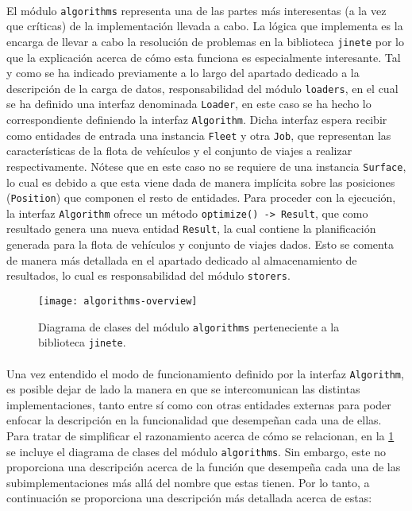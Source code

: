 \documentclass{subfiles}
\begin{document}
          \paragraph{}
          El módulo \texttt{algorithms} representa una de las partes más interesentas (a la vez que críticas) de la implementación llevada a cabo. La lógica que implementa es la encarga de llevar a cabo la resolución de problemas en la biblioteca \texttt{jinete} por lo que la explicación acerca de cómo esta funciona es especialmente interesante. Tal y como se ha indicado previamente a lo largo del apartado dedicado a la descripción de la carga de datos, responsabilidad del módulo \texttt{loaders}, en el cual se ha definido una interfaz denominada \texttt{Loader}, en este caso se ha hecho lo correspondiente definiendo la interfaz \texttt{Algorithm}. Dicha interfaz espera recibir como entidades de entrada una instancia \texttt{Fleet} y otra \texttt{Job}, que representan las características de la flota de vehículos y el conjunto de viajes a realizar respectivamente. Nótese que en este caso no se requiere de una instancia \texttt{Surface}, lo cual es debido a que esta viene dada de manera implícita sobre las posiciones (\texttt{Position}) que componen el resto de entidades. Para proceder con la ejecución, la interfaz \texttt{Algorithm} ofrece un método \verb|optimize() -> Result|, que como resultado genera una nueva entidad \texttt{Result}, la cual contiene la planificación generada para la flota de vehículos y conjunto de viajes dados. Esto se comenta de manera más detallada en el apartado dedicado al almacenamiento de resultados, lo cual es responsabilidad del módulo \texttt{storers}.

          \begin{figure}[!ht]
            \centering
            \texttt{[image: algorithms-overview]}
            \caption{Diagrama de clases del módulo \texttt{algorithms} perteneciente a la biblioteca \texttt{jinete}.}
            \label{img:algorithms_overview}
          \end{figure}

          \paragraph{}
          Una vez entendido el modo de funcionamiento definido por la interfaz \texttt{Algorithm}, es posible dejar de lado la manera en que se intercomunican las distintas implementaciones, tanto entre sí como con otras entidades externas para poder enfocar la descripción en la funcionalidad que desempeñan cada una de ellas. Para tratar de simplificar el razonamiento acerca de cómo se relacionan, en la \cref{img:algorithms_overview} se incluye el diagrama de clases del módulo \texttt{algorithms}. Sin embargo, este no proporciona una descripción acerca de la función que desempeña cada una de las subimplementaciones más allá del nombre que estas tienen. Por lo tanto, a continuación se proporciona una descripción más detallada acerca de estas:
\end{document}
